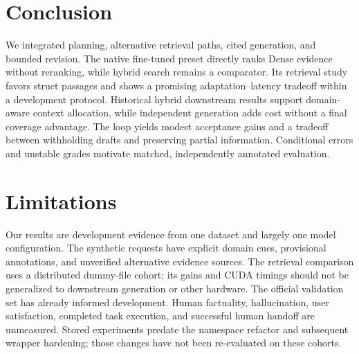 \section{Conclusion}
We integrated planning, alternative retrieval paths, cited generation, and bounded revision. The native fine-tuned preset directly ranks Dense evidence without reranking, while hybrid search remains a comparator. Its retrieval study favors struct passages and shows a promising adaptation--latency tradeoff within a development protocol. Historical hybrid downstream results support domain-aware context allocation, while independent generation adds cost without a final coverage advantage. The loop yields modest acceptance gains and a tradeoff between withholding drafts and preserving partial information. Conditional errors and unstable grades motivate matched, independently annotated evaluation.

\section*{Limitations}
Our results are development evidence from one dataset and largely one model configuration. The synthetic requests have explicit domain cues, provisional annotations, and unverified alternative evidence sources. The retrieval comparison uses a distributed dummy-file cohort; its gains and CUDA timings should not be generalized to downstream generation or other hardware. The official validation set has already informed development. Human factuality, hallucination, user satisfaction, completed task execution, and successful human handoff are unmeasured. Stored experiments predate the namespace refactor and subsequent wrapper hardening; those changes have not been re-evaluated on these cohorts.
